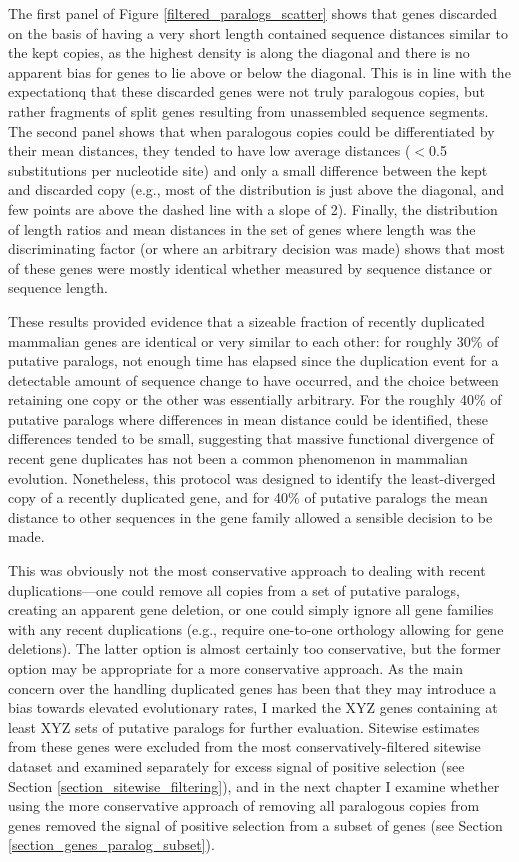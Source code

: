 The first panel of Figure \ref{filtered_paralogs_scatter} shows that
genes discarded on the basis of having a very short length contained
sequence distances similar to the kept copies, as the highest density
is along the diagonal and there is no apparent bias for genes to lie
above or below the diagonal. This is in line with the expectationq
that these discarded genes were not truly paralogous copies, but
rather fragments of split genes resulting from unassembled sequence
segments. The second panel shows that when paralogous copies could be
differentiated by their mean distances, they tended to have low
average distances ($<$0.5 substitutions per nucleotide site) and only
a small difference between the kept and discarded copy (e.g., most of
the distribution is just above the diagonal, and few points are above
the dashed line with a slope of 2). Finally, the distribution of
length ratios and mean distances in the set of genes where length was
the discriminating factor (or where an arbitrary decision was made)
shows that most of these genes were mostly identical whether measured
by sequence distance or sequence length.

These results provided evidence that a sizeable fraction of recently
duplicated mammalian genes are identical or very similar to each
other: for roughly 30\% of putative paralogs, not enough time has
elapsed since the duplication event for a detectable amount of
sequence change to have occurred, and the choice between retaining one
copy or the other was essentially arbitrary. For the roughly 40\% of
putative paralogs where differences in mean distance could be
identified, these differences tended to be small, suggesting that
massive functional divergence of recent gene duplicates has not been a
common phenomenon in mammalian evolution. Nonetheless, this protocol
was designed to identify the least-diverged copy of a recently
duplicated gene, and for 40\% of putative paralogs the mean distance
to other sequences in the gene family allowed a sensible decision to
be made.

This was obviously not the most conservative approach to dealing with
recent duplications---one could remove all copies from a set of
putative paralogs, creating an apparent gene deletion, or one could
simply ignore all gene families with any recent duplications (e.g.,
require one-to-one orthology allowing for gene deletions). The latter
option is almost certainly too conservative, but the former option may
be appropriate for a more conservative approach. As the main concern
over the handling duplicated genes has been that they may introduce a
bias towards elevated evolutionary rates, I marked the XYZ genes
containing at least XYZ sets of putative paralogs for further
evaluation. Sitewise estimates from these genes were excluded from the
most conservatively-filtered sitewise dataset and examined separately
for excess signal of positive selection (see Section
\ref{section_sitewise_filtering}), and in the next chapter I examine
whether using the more conservative approach of removing all
paralogous copies from genes removed the signal of positive selection
from a subset of genes (see Section
\ref{section_genes_paralog_subset}).

